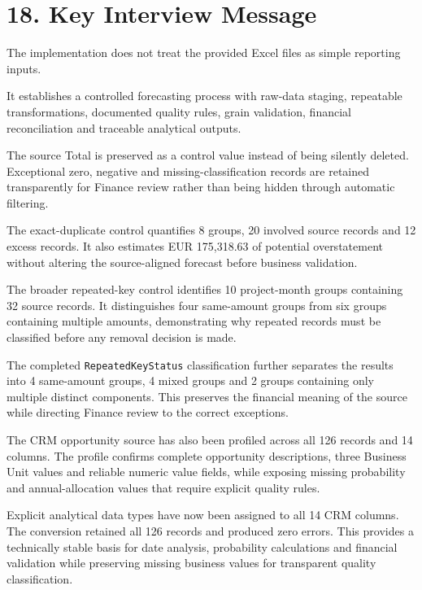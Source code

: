 \documentclass[11pt,a4paper]{article}
\begin{document}

\section{18. Key Interview Message}

\begin{summarybox}

The implementation does not treat the provided Excel files as simple
reporting inputs.

It establishes a controlled forecasting process with raw-data staging,
repeatable transformations, documented quality rules, grain validation,
financial reconciliation and traceable analytical outputs.

The source Total is preserved as a control value instead of being silently
deleted. Exceptional zero, negative and missing-classification records are
retained transparently for Finance review rather than being hidden through
automatic filtering.

The exact-duplicate control quantifies 8 groups, 20 involved source
records and 12 excess records. It also estimates EUR 175,318.63 of
potential overstatement without altering the source-aligned forecast
before business validation.

The broader repeated-key control identifies 10 project-month groups
containing 32 source records. It distinguishes four same-amount groups
from six groups containing multiple amounts, demonstrating why repeated
records must be classified before any removal decision is made.

The completed \texttt{RepeatedKeyStatus} classification further separates
the results into 4 same-amount groups, 4 mixed groups and 2 groups containing
only multiple distinct components. This preserves the financial meaning of
the source while directing Finance review to the correct exceptions.

The CRM opportunity source has also been profiled across all 126 records and
14 columns. The profile confirms complete opportunity descriptions, three
Business Unit values and reliable numeric value fields, while exposing missing
probability and annual-allocation values that require explicit quality rules.

Explicit analytical data types have now been assigned to all 14 CRM columns.
The conversion retained all 126 records and produced zero errors. This provides
a technically stable basis for date analysis, probability calculations and
financial validation while preserving missing business values for transparent
quality classification.


\end{summarybox}
\end{document}
